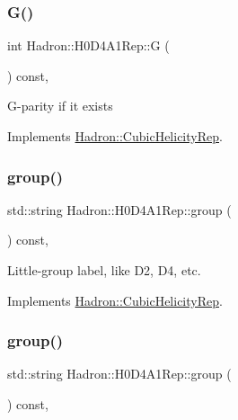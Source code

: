 \subsubsection{\texorpdfstring{G()}{G()}\hspace{0.1cm}{\footnotesize\ttfamily [3/3]}}
{\footnotesize\ttfamily int Hadron\+::\+H0\+D4\+A1\+Rep\+::G (\begin{DoxyParamCaption}{ }\end{DoxyParamCaption}) const\hspace{0.3cm}{\ttfamily [inline]}, {\ttfamily [virtual]}}

G-\/parity if it exists 

Implements \mbox{\hyperlink{structHadron_1_1CubicHelicityRep_a50689f42be1e6170aa8cf6ad0597018b}{Hadron\+::\+Cubic\+Helicity\+Rep}}.

\mbox{\label{structHadron_1_1H0D4A1Rep_abc2f3e6961a83aec1fdfa3909b4925dd}} 
\subsubsection{\texorpdfstring{group()}{group()}\hspace{0.1cm}{\footnotesize\ttfamily [1/5]}}
{\footnotesize\ttfamily std\+::string Hadron\+::\+H0\+D4\+A1\+Rep\+::group (\begin{DoxyParamCaption}{ }\end{DoxyParamCaption}) const\hspace{0.3cm}{\ttfamily [inline]}, {\ttfamily [virtual]}}

Little-\/group label, like D2, D4, etc. 

Implements \mbox{\hyperlink{structHadron_1_1CubicHelicityRep_a101a7d76cd8ccdad0f272db44b766113}{Hadron\+::\+Cubic\+Helicity\+Rep}}.

\mbox{\label{structHadron_1_1H0D4A1Rep_abc2f3e6961a83aec1fdfa3909b4925dd}} 
\subsubsection{\texorpdfstring{group()}{group()}\hspace{0.1cm}{\footnotesize\ttfamily [2/5]}}
{\footnotesize\ttfamily std\+::string Hadron\+::\+H0\+D4\+A1\+Rep\+::group (\begin{DoxyParamCaption}{ }\end{DoxyParamCaption}) const\hspace{0.3cm}{\ttfamily [inline]}, {\ttfamily [virtual]}}

